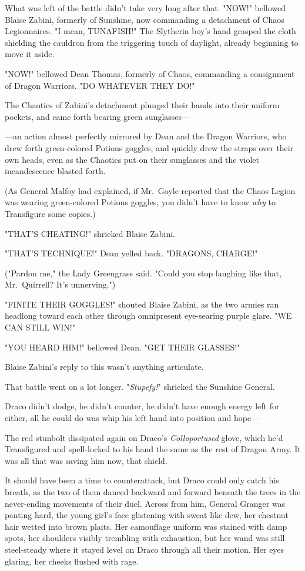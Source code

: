 What was left of the battle didn't take very long after that.
\sbreak
"NOW!" bellowed Blaise Zabini, formerly of Sunshine, now commanding a
detachment of Chaos Legionnaires. "I mean, TUNAFISH!" The Slytherin boy's hand
grasped the cloth shielding the cauldron from the triggering touch of daylight,
already beginning to move it aside.

"NOW!" bellowed Dean Thomas, formerly of Chaos, commanding a consignment of
Dragon Warriors. "DO WHATEVER THEY DO!"

The Chaotics of Zabini's detachment plunged their hands into their uniform
pockets, and came forth bearing green sunglasses---

---an action almost perfectly mirrored by Dean and the Dragon Warriors, who
drew forth green-colored Potions goggles, and quickly drew the straps over
their own heads, even as the Chaotics put on their sunglasses and the violet
incandescence blasted forth.

(As General Malfoy had explained, if Mr.~Goyle reported that the Chaos Legion
was wearing green-colored Potions goggles, you didn't have to know \emph{why}
to Transfigure some copies.)

"THAT'S CHEATING!" shrieked Blaise Zabini.

"THAT'S TECHNIQUE!" Dean yelled back. "DRAGONS, CHARGE!"

("Pardon me," the Lady Greengrass said. "Could you stop laughing like that,
Mr.~Quirrell? It's unnerving.")

"FINITE THEIR GOGGLES!" shouted Blaise Zabini, as the two armies ran headlong
toward each other through omnipresent eye-searing purple glare. "WE CAN STILL
WIN!"

"YOU HEARD HIM!" bellowed Dean. "GET THEIR GLASSES!"

Blaise Zabini's reply to this wasn't anything articulate.

That battle went on a lot longer.
\sbreak
"\emph{Stupefy!}" shrieked the Sunshine General.

Draco didn't dodge, he didn't counter, he didn't have enough energy left for
either, all he could do was whip his left hand into position and hope---

The red stunbolt dissipated again on Draco's \emph{Colloportused} glove, which
he'd Transfigured and spell-locked to his hand the same as the rest of Dragon
Army. It was all that was saving him now, that shield.

It should have been a time to counterattack, but Draco could only catch his
breath, as the two of them danced backward and forward beneath the trees in the
never-ending movements of their duel. Across from him, General Granger was
panting hard, the young girl's face glistening with sweat like dew, her
chestnut hair wetted into brown plaits. Her camouflage uniform was stained with
damp spots, her shoulders visibly trembling with exhaustion, but her wand was
still steel-steady where it stayed level on Draco through all their motion. Her
eyes glaring, her cheeks flushed with rage.

